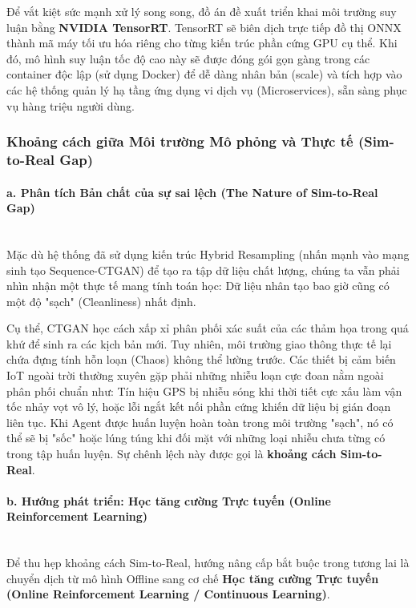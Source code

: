 Để vắt kiệt sức mạnh xử lý song song, đồ án đề xuất triển khai môi trường suy luận bằng \textbf{NVIDIA TensorRT}. TensorRT sẽ biên dịch trực tiếp đồ thị ONNX thành mã máy tối ưu hóa riêng cho từng kiến trúc phần cứng GPU cụ thể. Khi đó, mô hình suy luận tốc độ cao này sẽ được đóng gói gọn gàng trong các container độc lập (sử dụng Docker) để dễ dàng nhân bản (scale) và tích hợp vào các hệ thống quản lý hạ tầng ứng dụng vi dịch vụ (Microservices), sẵn sàng phục vụ hàng triệu người dùng.

\subsubsection{Khoảng cách giữa Môi trường Mô phỏng và Thực tế (Sim-to-Real Gap)}

\paragraph{a. Phân tích Bản chất của sự sai lệch (The Nature of Sim-to-Real Gap)} \mbox{} \\
Mặc dù hệ thống đã sử dụng kiến trúc Hybrid Resampling (nhấn mạnh vào mạng sinh tạo Sequence-CTGAN) để tạo ra tập dữ liệu chất lượng, chúng ta vẫn phải nhìn nhận một thực tế mang tính toán học: Dữ liệu nhân tạo bao giờ cũng có một độ "sạch" (Cleanliness) nhất định.

Cụ thể, CTGAN học cách xấp xỉ phân phối xác suất của các thảm họa trong quá khứ để sinh ra các kịch bản mới. Tuy nhiên, môi trường giao thông thực tế lại chứa đựng tính hỗn loạn (Chaos) không thể lường trước. Các thiết bị cảm biến IoT ngoài trời thường xuyên gặp phải những nhiễu loạn cực đoan nằm ngoài phân phối chuẩn như: Tín hiệu GPS bị nhiễu sóng khi thời tiết cực xấu làm vận tốc nhảy vọt vô lý, hoặc lỗi ngắt kết nối phần cứng khiến dữ liệu bị gián đoạn liên tục. Khi Agent được huấn luyện hoàn toàn trong môi trường "sạch", nó có thể sẽ bị "sốc" hoặc lúng túng khi đối mặt với những loại nhiễu chưa từng có trong tập huấn luyện. Sự chênh lệch này được gọi là \textbf{khoảng cách Sim-to-Real}.

\paragraph{b. Hướng phát triển: Học tăng cường Trực tuyến (Online Reinforcement Learning)} \mbox{} \\
Để thu hẹp khoảng cách Sim-to-Real, hướng nâng cấp bắt buộc trong tương lai là chuyển dịch từ mô hình Offline sang cơ chế \textbf{Học tăng cường Trực tuyến (Online Reinforcement Learning / Continuous Learning)}.

